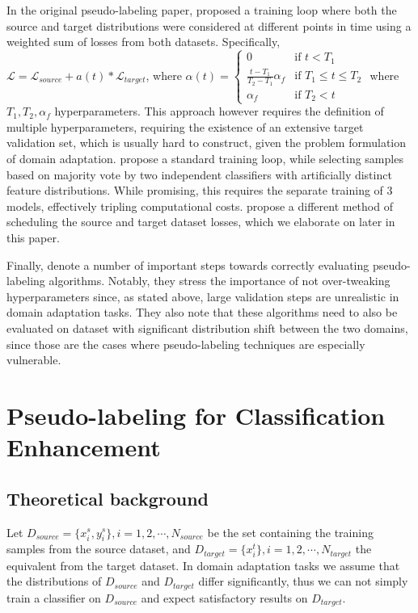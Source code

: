 \documentclass{article}
\newcommand{\loss}{\mathcal{L}}
\begin{document}
	In the original pseudo-labeling paper, \cite{pseudo-label-original} proposed a training loop where both the source and target distributions were considered at different points in time using a weighted sum of losses from both datasets. Specifically, $\loss = \loss_{source} + a(t) * \loss_{target}$, where $\alpha(t) = 
	\begin{cases} 0 & \text{if } t < T_1 \\
		\frac{t-T_1}{T_2-T_1}\alpha_f & \text{if } T_1 \leq t \leq T_2 \\
		\alpha_f & \text{if } T_2 < t
	\end{cases}$
	where $T_1, T_2, \alpha_f$ hyperparameters. This approach however requires the definition of multiple hyperparameters, requiring the existence of an extensive target validation set, which is usually hard to construct, given the problem formulation of domain adaptation. \cite{three-models} propose a standard    training loop, while selecting samples based on majority vote by two independent classifiers with artificially distinct feature distributions. While promising, this requires the separate training of 3 models, effectively tripling computational costs. \cite{ican} propose a different method of scheduling the source and target dataset losses, which we elaborate on later in this paper.
	
	Finally, \cite{pseudo-label-evaluation} denote a number of important steps towards correctly evaluating pseudo-labeling algorithms. Notably, they stress the importance of not over-tweaking hyperparameters since, as stated above, large validation steps are unrealistic in domain adaptation tasks. They also note that these algorithms need to also be evaluated on dataset with significant distribution shift between the two domains, since those are the cases where pseudo-labeling techniques are especially vulnerable.
	
	
	\section{Pseudo-labeling for Classification Enhancement}
	
	\subsection{Theoretical background}
	
	
	Let $D_{source} = \{x_i^s, y_i^s\}, i=1,2,\cdots, N_{source}$ be the set containing the training samples from the source dataset, and $D_{target} = \{x_i^t\}, i=1,2,\cdots, N_{target}$ the equivalent from the target dataset. In domain adaptation tasks we assume that the distributions of $D_{source}$ and $D_{target}$ differ significantly, thus we can not simply train a classifier on $D_{source}$ and expect satisfactory results on $D_{target}$.
	
\end{document}
